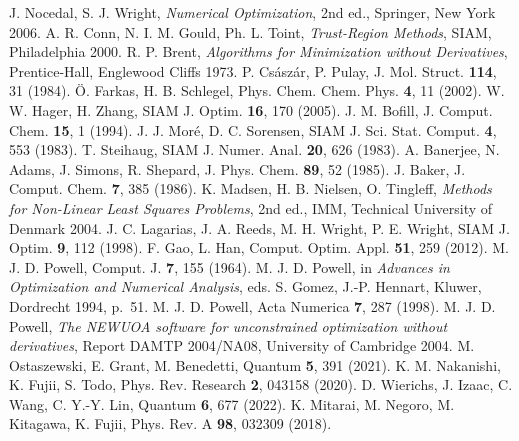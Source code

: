  J. Nocedal, S. J. Wright, \emph{Numerical Optimization}, 2nd ed., Springer, New York 2006.
 A. R. Conn, N. I. M. Gould, Ph. L. Toint, \emph{Trust-Region Methods}, SIAM, Philadelphia 2000.
 R. P. Brent, \emph{Algorithms for Minimization without Derivatives}, Prentice-Hall, Englewood Cliffs 1973.
 P. Cs\'asz\'ar, P. Pulay, J. Mol. Struct. \textbf{114}, 31 (1984).
 \"O. Farkas, H. B. Schlegel, Phys. Chem. Chem. Phys. \textbf{4}, 11 (2002).
 W. W. Hager, H. Zhang, SIAM J. Optim. \textbf{16}, 170 (2005).
 J. M. Bofill, J. Comput. Chem. \textbf{15}, 1 (1994).
 J. J. Mor\'e, D. C. Sorensen, SIAM J. Sci. Stat. Comput. \textbf{4}, 553 (1983).
 T. Steihaug, SIAM J. Numer. Anal. \textbf{20}, 626 (1983).
 A. Banerjee, N. Adams, J. Simons, R. Shepard, J. Phys. Chem. \textbf{89}, 52 (1985).
 J. Baker, J. Comput. Chem. \textbf{7}, 385 (1986).
 K. Madsen, H. B. Nielsen, O. Tingleff, \emph{Methods for Non-Linear Least Squares Problems}, 2nd ed., IMM, Technical University of Denmark 2004.
 J. C. Lagarias, J. A. Reeds, M. H. Wright, P. E. Wright, SIAM J. Optim. \textbf{9}, 112 (1998).
 F. Gao, L. Han, Comput. Optim. Appl. \textbf{51}, 259 (2012).
 M. J. D. Powell, Comput. J. \textbf{7}, 155 (1964).
 M. J. D. Powell, in \emph{Advances in Optimization and Numerical Analysis}, eds. S. Gomez, J.-P. Hennart, Kluwer, Dordrecht 1994, p.~51.
 M. J. D. Powell, Acta Numerica \textbf{7}, 287 (1998).
 M. J. D. Powell, \emph{The NEWUOA software for unconstrained optimization without derivatives}, Report DAMTP 2004/NA08, University of Cambridge 2004.
 M. Ostaszewski, E. Grant, M. Benedetti, Quantum \textbf{5}, 391 (2021).
 K. M. Nakanishi, K. Fujii, S. Todo, Phys. Rev. Research \textbf{2}, 043158 (2020).
 D. Wierichs, J. Izaac, C. Wang, C. Y.-Y. Lin, Quantum \textbf{6}, 677 (2022).
 K. Mitarai, M. Negoro, M. Kitagawa, K. Fujii, Phys. Rev. A \textbf{98}, 032309 (2018).
